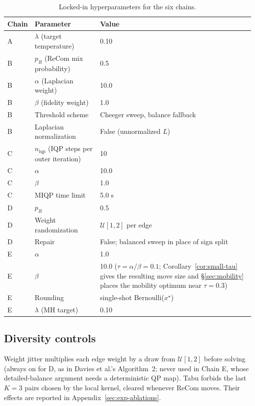 \documentclass[11pt]{article}
\begin{document}
\begin{table}[htbp]
\centering
\small
\begin{tabular}{lll}
\toprule
Chain & Parameter & Value \\
\midrule
A & $\lambda$ (target temperature) & 0.10 \\
B & $p_R$ (ReCom mix probability) & 0.5 \\
B & $\alpha$ (Laplacian weight) & 10.0 \\
B & $\beta$ (fidelity weight) & 1.0 \\
B & Threshold scheme & Cheeger sweep, balance fallback \\
B & Laplacian normalization & False (unnormalized $L$) \\
C & $n_{\mathrm{iqp}}$ (IQP steps per outer iteration) & 10 \\
C & $\alpha$ & 10.0 \\
C & $\beta$ & 1.0 \\
C & MIQP time limit & 5.0 s \\
D & $p_R$ & 0.5 \\
D & Weight randomization & $\mathcal{U}[1, 2]$ per edge \\
D & Repair & False; balanced sweep in place of sign split \\
E & $\alpha$ & 1.0 \\
E & $\beta$ & 10.0 ($\tau = \alpha/\beta = 0.1$; Corollary~\ref{cor:small-tau} gives the resulting move size and \S\ref{sec:mobility} places the mobility optimum near $\tau = 0.3$) \\
E & Rounding & single-shot Bernoulli($x^\star$) \\
E & $\lambda$ (MH target) & 0.10 \\
\bottomrule
\end{tabular}
\caption{Locked-in hyperparameters for the six
  chains.}\label{tab:hyperparams}
\end{table}

\subsection{Diversity controls}\label{app:diversity}

Weight jitter multiplies each edge weight by a draw from
$\mathcal{U}[1, 2]$ before solving (always on for D, as in Davies et
al.'s Algorithm~2; never used in Chain E, whose detailed-balance
argument needs a deterministic QP map). Tabu forbids the last $K = 3$
pairs chosen by the local kernel, cleared whenever ReCom moves.
Their effects are reported in Appendix~\ref{sec:exp-ablations}.
\end{document}
